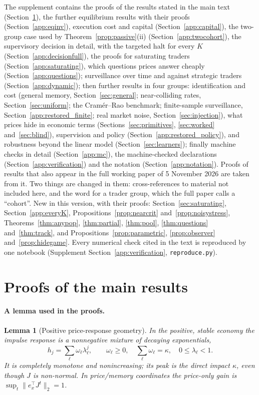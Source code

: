 \documentclass[12pt]{article}
\newtheorem{lemma}[theorem]{Lemma}
\theoremstyle{definition}
\theoremstyle{remark}
\begin{document}
\noindent The supplement contains the proofs of the results stated in the main text (Section~\ref{app:proofs}), the further equilibrium results with their proofs (Section~\ref{app:eqinv}), execution cost and capital (Section~\ref{app:capital}), the two-group case used by Theorem~\ref{prop:passive}(ii) (Section~\ref{app:twocohort}), the supervisory decision in detail, with the targeted halt for every $K$ (Section~\ref{app:decisionfull}), the proofs for saturating traders (Section~\ref{app:saturating}), which questions prices answer cheaply (Section~\ref{app:questions}); surveillance over time and against strategic traders (Section~\ref{app:dynamic}); then further results in four groups: identification and cost (general memory, Section~\ref{sec:general}; near-colliding rates, Section~\ref{sec:uniform}; the Cram\'er--Rao benchmark; finite-sample surveillance, Section~\ref{app:restored_finite}; real market noise, Section~\ref{sec:injection}), what prices hide in economic terms (Sections~\ref{sec:primitives}, \ref{sec:worked} and~\ref{sec:blind}), supervision and policy (Section~\ref{app:restored_policy}), and robustness beyond the linear model (Section~\ref{sec:learners}); finally machine checks in detail (Section~\ref{app:mc}), the machine-checked declarations (Section~\ref{app:verification}) and the notation (Section~\ref{app:notation}). Proofs of results that also appear in the full working paper of 5 November 2026 are taken from it. Two things are changed in them: cross-references to material not included here, and the word for a trader group, which the full paper calls a ``co\-hort''. New in this version, with their proofs: Section~\ref{sec:saturating}, Section~\ref{app:everyK}, Propositions~\ref{prop:nearcrit} and~\ref{prop:noisystress}, Theorems~\ref{thm:anypop}, \ref{thm:partial}, \ref{thm:pool}, \ref{thm:questions} and~\ref{thm:track}, and Propositions~\ref{prop:parametric}, \ref{prop:observer} and~\ref{prop:hidegame}. Every numerical check cited in the text is reproduced by one notebook (Supplement Section~\ref{app:verification}, \nolinkurl{reproduce.py}).

\section{Proofs of the main results}\label{app:proofs}

\paragraph{A lemma used in the proofs.}
\begin{lemma}[Positive price-response geometry]\label{lem:cm}
In the positive, stable economy the impulse response is a nonnegative mixture of decaying exponentials,
\[
h_j=\sum_\ell \omega_\ell\lambda_\ell^j,\qquad \omega_\ell\ge0,\quad \sum_\ell\omega_\ell=\kappa,\quad 0\le\lambda_\ell<1 .
\]
It is completely monotone and nonincreasing; its peak is the direct impact $\kappa$, even though $J$ is non-normal. In price/memory coordinates the price-only gain is $\sup_t\|e_x^\top J^t\|_2=1$.
\end{lemma}
\end{document}
